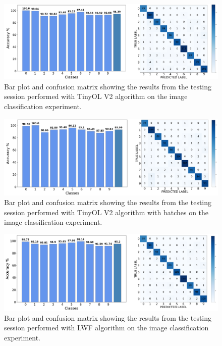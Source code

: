 \documentclass[12pt]{report}
\begin{document}
\begin{figure}[h!]
    \centering
    \includegraphics[width=140mm]{Figures/Chapter5/OPENMV_OLV2.png} 
    \caption{Bar plot and confusion matrix showing the results from the testing session performed with TinyOL V2 algorithm on the image classification experiment.}
    \label{fig:openmv_res_OL_v2}    
\end{figure}

\begin{figure}[h!]
    \centering
    \includegraphics[width=140mm]{Figures/Chapter5/OPENMV_OLV2_BATCH.png} 
    \caption{Bar plot and confusion matrix showing the results from the testing session performed with TinyOL V2 algorithm with batches on the image classification experiment.}
    \label{fig:openmv_res_OL_v2_batch}    
\end{figure}

\begin{figure}[h!]
    \centering
    \includegraphics[width=140mm]{Figures/Chapter5/OPENMV_LWF.png} 
    \caption{Bar plot and confusion matrix showing the results from the testing session performed with LWF algorithm on the image classification experiment.}
    \label{fig:openmv_res_LWF}    
\end{figure}
\end{document}

